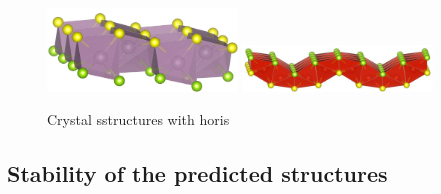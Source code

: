 \documentclass[a4paperm]{article}
\begin{document}
\begin{figure}
	\includegraphics[width=0.45\textwidth]{H_hor_smose.jpg}
	\includegraphics[width=0.45\textwidth]{T_hor_svse.jpg}
	\caption{Crystal sstructures with horis}
\label{hor_T_H}

\end{figure} 




\subsection{Stability of the predicted structures}
\end{document}
